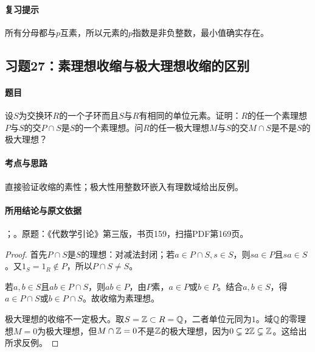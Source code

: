 \paragraph{复习提示}

所有分母都与$p$互素，所以元素的$p$指数是非负整数，最小值确实存在。

\subsection{习题27：素理想收缩与极大理想收缩的区别}

\label{ex:4:27}

\paragraph{题目}

设$S$为交换环$R$的一个子环而且$S$与$R$有相同的单位元素。证明：$R$的任一个素理想$P$与$S$的交$P\cap S$是$S$的一个素理想。问$R$的任一极大理想$M$与$S$的交$M\cap S$是不是$S$的极大理想？

\paragraph{考点与思路}

直接验证收缩的素性；极大性用整数环嵌入有理数域给出反例。

\paragraph{所用结论与原文依据}

；。原题：《代数学引论》第三版，书页159，扫描PDF第169页。


\begin{proof}

首先$P\cap S$是$S$的理想：对减法封闭；若$a\in P\cap S,s\in S$，则$sa\in P$且$sa\in S$。又$1_S=1_R\notin P$，所以$P\cap S\ne S$。

若$a,b\in S$且$ab\in P\cap S$，则$ab\in P$，由$P$素，$a\in P$或$b\in P$。结合$a,b\in S$，得$a\in P\cap S$或$b\in P\cap S$。故收缩为素理想。

极大理想的收缩不一定极大。取$S=\mathbb Z\subset R=\mathbb Q$，二者单位元同为$1$。域$\mathbb Q$的零理想$M=0$为极大理想，但$M\cap\mathbb Z=0$不是$\mathbb Z$的极大理想，因为$0\subsetneq2\mathbb Z\subsetneq\mathbb Z$。这给出所求反例。

\end{proof}

